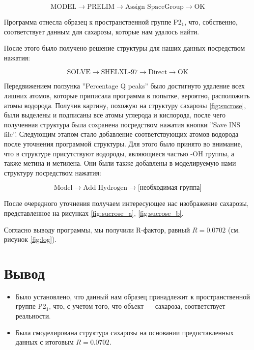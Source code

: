 \documentclass[a4paper, 12pt]{article}
\begin{document}
\begin{equation*}
	\text{MODEL} \rightarrow \text{PRELIM} \rightarrow \text{Assign SpaceGroup} \rightarrow \text{OK}
\end{equation*}

Программа отнесла образец к пространственной группе P2$_{1}$, что, собственно, соответствует данным для сахарозы, которые нам удалось найти.

После этого было получено решение структуры для наших данных посредством нажатия:

\begin{equation*}
	\text{SOLVE} \rightarrow \text{SHELXL-97} \rightarrow \text{Direct} \rightarrow \text{OK}
\end{equation*}

Передвижением ползунка ''Percentage Q peaks'' было достигнуто удаление всех лишних атомов, которые приписала программа в попытке, вероятно, расположить атомы водорода. Получив картину, похожую на структуру сахарозы \ref{fig:sucrose}, были выделены и подписаны все атомы углерода и кислорода, после чего полученная структура была сохранена посредством нажатия кнопки ''Save INS file''. Следующим этапом стало добавление соответствующих атомов водорода после уточнения программой структуры. Для этого было принято во внимание, что в структуре присутствуют водороды, являющиеся частью -OH группы, а также метина и метилена. Они были также добавлены в моделируемую нами структуру посредством нажатия:

\begin{equation*}
	\text{Model} \rightarrow \text{Add Hydrogen} \rightarrow \text{[необходимая группа]}
\end{equation*}

После очередного уточнения получаем интересующее нас изображение сахарозы, представленное на рисунках \ref{fig:sucrose_a}, \ref{fig:sucrose_b}.

Согласно выводу программы, мы получили R-фактор, равный $\boxed{R = 0.0702}$ (см. рисунок \ref{fig:log}).

\section{Вывод}

\begin{itemize}
	\item Было установлено, что данный нам образец принадлежит к пространственной группе P2$_{1}$, что, с учетом того, что объект --- сахароза, соответствует реальности.
	
	\item Была смоделирована структура сахарозы на основании предоставленных данных с итоговым \mbox{$R = 0.0702$}.
\end{itemize}
\end{document}
